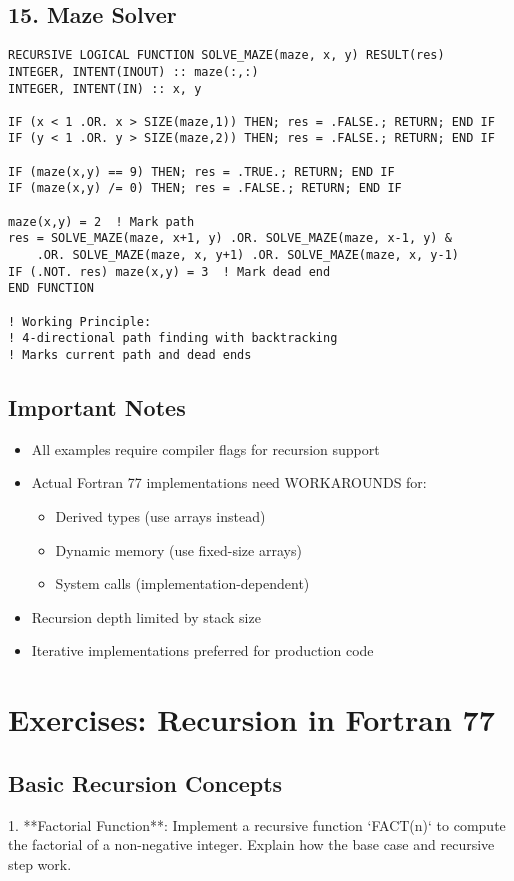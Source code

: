 \documentclass{book}
\begin{document}
\subsection*{15. Maze Solver}
\begin{verbatim}
RECURSIVE LOGICAL FUNCTION SOLVE_MAZE(maze, x, y) RESULT(res)
INTEGER, INTENT(INOUT) :: maze(:,:)
INTEGER, INTENT(IN) :: x, y

IF (x < 1 .OR. x > SIZE(maze,1)) THEN; res = .FALSE.; RETURN; END IF
IF (y < 1 .OR. y > SIZE(maze,2)) THEN; res = .FALSE.; RETURN; END IF

IF (maze(x,y) == 9) THEN; res = .TRUE.; RETURN; END IF
IF (maze(x,y) /= 0) THEN; res = .FALSE.; RETURN; END IF

maze(x,y) = 2  ! Mark path
res = SOLVE_MAZE(maze, x+1, y) .OR. SOLVE_MAZE(maze, x-1, y) &
    .OR. SOLVE_MAZE(maze, x, y+1) .OR. SOLVE_MAZE(maze, x, y-1)
IF (.NOT. res) maze(x,y) = 3  ! Mark dead end
END FUNCTION

! Working Principle:
! 4-directional path finding with backtracking
! Marks current path and dead ends
\end{verbatim}

\subsection*{Important Notes}
\begin{itemize}
\item All examples require compiler flags for recursion support
\item Actual Fortran 77 implementations need WORKAROUNDS for:
  \begin{itemize}
  \item Derived types (use arrays instead)
  \item Dynamic memory (use fixed-size arrays)
  \item System calls (implementation-dependent)
  \end{itemize}
\item Recursion depth limited by stack size
\item Iterative implementations preferred for production code
\end{itemize}

\section{Exercises: Recursion in Fortran 77}

\subsection*{Basic Recursion Concepts}  
1. **Factorial Function**:  
   Implement a recursive function `FACT(n)` to compute the factorial of a non-negative integer. Explain how the base case and recursive step work.  
\end{document}
